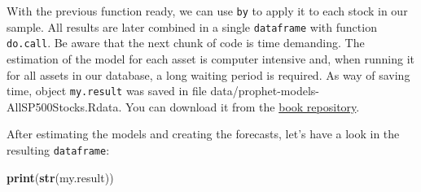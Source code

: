 \documentclass[11pt,]{book}
\newenvironment{Shaded}{\begin{snugshade}}{\end{snugshade}}
\newcommand{\KeywordTok}[1]{\textcolor[rgb]{0.27,0.27,0.27}{\textbf{#1}}}
\newcommand{\DataTypeTok}[1]{\textcolor[rgb]{0.27,0.27,0.27}{#1}}
\newcommand{\StringTok}[1]{\textcolor[rgb]{0.5,0.5,0.5}{#1}}
\newcommand{\CommentTok}[1]{\textcolor[rgb]{0.56,0.35,0.01}{\textit{#1}}}
\newcommand{\OtherTok}[1]{\textcolor[rgb]{0.56,0.35,0.01}{#1}}
\newcommand{\OperatorTok}[1]{\textcolor[rgb]{0.81,0.36,0.00}{\textbf{#1}}}
\newcommand{\NormalTok}[1]{#1}
\begin{document}
\begin{Shaded}
\end{Shaded}

With the previous function ready, we can use \texttt{by} to apply it to
each stock in our sample. All results are later combined in a single
\texttt{dataframe} with function \texttt{do.call}. Be aware that the
next chunk of code is time demanding. The estimation of the model for
each asset is computer intensive and, when running it for all assets in
our database, a long waiting period is required. As way of saving time,
object \texttt{my.result} was saved in file
data/prophet-models-AllSP500Stocks.Rdata. You can download it from the
\href{https://github.com/msperlin/pmfdR-en-code_data}{book repository}.

\begin{Shaded}
\end{Shaded}

After estimating the models and creating the forecasts, let's have a
look in the resulting \texttt{dataframe}:

\begin{Shaded}
\begin{Highlighting}[]
\KeywordTok{print}\NormalTok{(}\KeywordTok{str}\NormalTok{(my.result))}
\end{Highlighting}
\end{Shaded}
\end{document}
